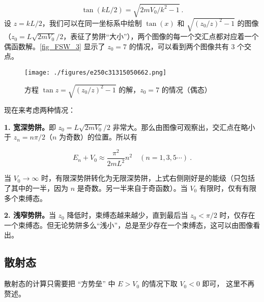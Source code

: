 \begin{equation}
\tan(k L/2)=\sqrt{2mV_0/k^2-1}~.
\end{equation}
设 $z=k L/2$，我们可以在同一坐标系中绘制 $\tan(x)$ 和 $\sqrt{(z_0/z)^2-1}$ 的图像（$z_0=L\sqrt{2mV_0}/2$，表征了势阱“大小”），两个图像的每一个交汇点都对应着一个偶函数解。\autoref{fig_FSW_3} 显示了 $z_0=7$ 的情况，可以看到两个图像共有 $3$ 个交点。

\begin{figure}[ht]
\centering
\texttt{[image: ./figures/e250c31315050662.png]}
\caption{方程 $\tan z=\sqrt{(z_0/z)^2-1}$ 的解，$z_0=7$ 的情况（偶态）} \label{fig_FSW_3}
\end{figure}

现在来考虑两种情况：

\textbf{1. 宽深势阱。}即 $z_0=L\sqrt{2mV_0}/2$ 非常大。那么由图像可观察出，交汇点在略小于 $z_n=n\pi/2$（$n$ 为奇数）的位置。所以有

\begin{equation}
E_n+V_0\approx \frac{\pi^2}{2mL^2}n^2\quad (n=1,3,5\cdots)~.
\end{equation}

当 $V_0\rightarrow \infty$ 时，有限深势阱转化为无限深势阱，上式右侧刚好是的能级（只包括了其中的一半，因为 $n$ 是奇数。另一半来自于奇函数）。当 $V_0$ 有限时，仅有有限多个束缚态。

\textbf{2. 浅窄势阱。}当 $z_0$ 降低时，束缚态越来越少，直到最后当 $z_0<\pi/2$ 时，仅存在一个束缚态。但无论势阱多么“浅小”，总是至少存在一个束缚态，这可以由图像看出。

\subsection{散射态}

散射态的计算只需要把 “方势垒” 中 $E > V_0$ 的情况下取 $V_0 < 0$ 即可， 这里不再赘述。

